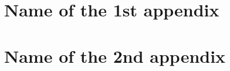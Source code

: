 
\newpage


\appendix

\chapter{Name of the 1st appendix}
\lipsum[1]



\chapter{Name of the 2nd appendix}
\lipsum[1]